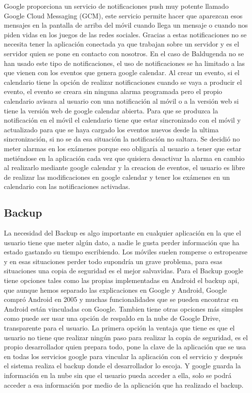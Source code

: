 Google proporciona un servicio de notificaciones push muy potente llamado Google Cloud Messaging (GCM), este servicio permite hacer que aparezcan esos mensajes en la pantalla de arriba del móvil cuando llega un mensaje o cuando nos piden vidas en los juegos de las redes sociales.
Gracias a estas notificaciones no se necesita tener la aplicación conectada ya que trabajan sobre un servidor y es el servidor quien se pone en contacto con nosotros.
En el caso de Baldugenda no se han usado este tipo de notificaciones, el uso de notificaciones se ha limitado a las que vienen con los eventos que genera google calendar.
Al crear un evento, si el calendario tiene la opción de realizar notificaciones cuando se vaya a producir el evento,   el evento se creara sin ninguna alarma programada pero el propio calendario avisara al usuario con una notificación al móvil o a la versión web si tiene la versión web de google calendar abierta.
Para que se produzca la notificación en el móvil el calendario tiene que estar sincronizado con el móvil y actualizado para que se haya cargado los eventos nuevos desde la ultima sincronización, si no se da esa situación la notificación no saltara.
Se decidió no meter alarmas en los exámenes porque eso obligaría al usuario a tener que estar metiéndose en la aplicación cada vez que quisiera desactivar la alarma en cambio al realizarlo mediante google calendar y la creacion de eventos, el usuario es libre de realizar las modificaciones en google calendar y tener los exámenes en un calendario con las notificaciones activadas.

\subsection{Backup}
\label{subsecc:Backup}

La necesidad del Backup es algo importante en cualquier aplicación en la que el usuario tiene que meter algún dato, a nadie le gusta perder información que ha estado gastando su tiempo escribiendo. Los móviles suelen romperse o estropearse y en esas situaciones perder todo supondría un grave problema, para esas situaciones una copia de seguridad es el mejor salvavidas.
Para el Backup google tiene opciones tales como las propias implementadas en Android el backup api, que aunque hemos separado las explicaciones en Google y Android, Google compró Android en 2005 y muchas funcionalidades que se pueden encontrar en Android están vinculadas con Google. Tambien tiene otras opciones más simples como puede ser usar una opción de respaldo en la nube de Google Drive, transparente para el usuario.
La primera opción la ventaja que tiene es que el usuario no tiene que realizar ningún paso para realizar la copia de seguridad, es el propio desarrollador quien prepara todo, pone la clave de la aplicación que se usa en todas los servicios google para vincular la aplicación con el servicio y después el sistema realiza el backup donde el desarrollador lo escoja. Y google guarda la información en la nube sin que el usuario pueda acceder a ella, solo se podrá acceder a esa información por medio de la aplicación que ha realizado el backup.


